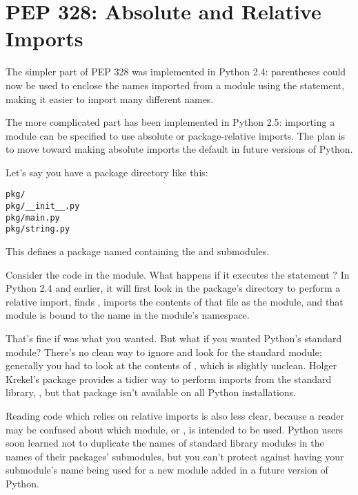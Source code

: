 \documentclass{howto}
\begin{document}
\section{PEP 328: Absolute and Relative Imports\label{pep-328}}

The simpler part of PEP 328 was implemented in Python 2.4: parentheses
could now be used to enclose the names imported from a module using
the  statement, making it easier to import
many different names.

The more complicated part has been implemented in Python 2.5:
importing a module can be specified to use absolute or
package-relative imports.  The plan is to move toward making absolute
imports the default in future versions of Python.

Let's say you have a package directory like this:
\begin{verbatim}
pkg/
pkg/__init__.py
pkg/main.py
pkg/string.py
\end{verbatim}

This defines a package named  containing the
 and  submodules.  

Consider the code in the  module.  What happens if it
executes the statement ?  In Python 2.4 and
earlier, it will first look in the package's directory to perform a
relative import, finds , imports the contents of
that file as the  module, and that module is bound
to the name  in the  module's namespace.

That's fine if  was what you wanted.  But what if
you wanted Python's standard  module?  There's no clean
way to ignore  and look for the standard module;
generally you had to look at the contents of , which
is slightly unclean.   
Holger Krekel's  package provides a tidier way to perform
imports from the standard library, ,
but that package isn't available on all Python installations.

Reading code which relies on relative imports is also less clear,
because a reader may be confused about which module, 
or , is intended to be used.  Python users soon
learned not to duplicate the names of standard library modules in the
names of their packages' submodules, but you can't protect against
having your submodule's name being used for a new module added in a
future version of Python.
\end{document}
